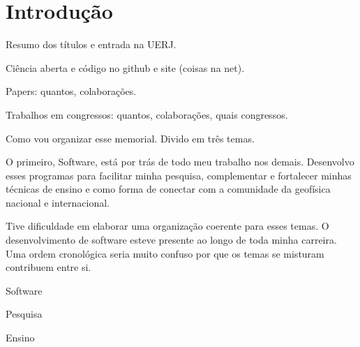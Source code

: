 \chapter{Introdução}

Resumo dos títulos e entrada na UERJ.

Ciência aberta e código no github e site (coisas na net).

Papers: quantos, colaborações.

Trabalhos em congressos: quantos, colaborações, quais congressos.

Como vou organizar esse memorial.
Divido em três temas.

O primeiro, Software, está por trás de todo meu trabalho nos demais.
Desenvolvo esses programas para facilitar minha pesquisa, complementar e
fortalecer minhas técnicas de ensino e como forma de conectar com a comunidade
da geofísica nacional e internacional.

Tive dificuldade em elaborar uma organização coerente para esses temas.
O desenvolvimento de software esteve presente ao longo de toda minha carreira.
Uma ordem cronológica seria muito confuso por que os temas se misturam contribuem entre si.

Software

Pesquisa

Ensino
